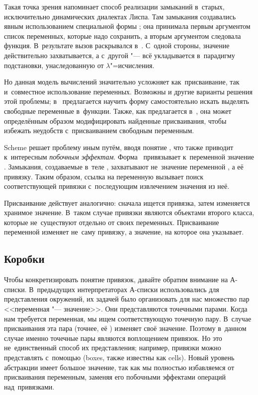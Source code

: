 Такая точка зрения напоминает способ реализации замыканий в~старых,
исключительно динамических диалектах Лиспа. Там замыкания создавались явным
использованием специальной формы ; она принимала первым аргументом
список переменных, которые надо сохранить, а вторым аргументом следовала
функция. В~результате вызов  раскрывался
в~. С~одной стороны,
значение действительно захватывается, а с~другой "--- всё укладывается
в~парадигму подстановки, унаследованную от $\lambda$"=исчисления.

Но данная модель вычислений значительно усложняет как~присваивание, так
и~совместное использование переменных. Возможны и другие варианты решения этой
проблемы; в~\cite{sj87} предлагается научить форму  самостоятельно
искать выделять свободные переменные в~функции. Также, как предлагается
в~\cite{bcsj86,sj93}, она может определённым образом модифицировать найденные
присваивания, чтобы избежать неудобств с~присваиванием свободным переменным.

Scheme решает проблему иным путём, вводя понятие , что также
приводит к~интересным \emph{побочным эффектам}. Форма~ привязывает
к~переменной  значение . Замыкания, создаваемые в~теле
, захватывают не~значение переменной , а её привязку. Таким
образом, ссылка на переменную  вызывает поиск соответствующей привязки
с~последующим извлечением значения из неё.

Присваивание действует аналогично: сначала ищется привязка, затем изменяется
хранимое значение. В~таком случае привязки являются объектами второго класса,
которые не~существуют отдельно от своих переменных. Присваивание переменной
изменяет не~саму привязку, а значение, на которое она указывает.


\subsection{Коробки}\label{assignment/assignment/ssect:boxes}

Чтобы конкретизировать понятие привязок, давайте обратим внимание на А-списки.
В~предыдущих интерпретаторах А-списки использовались для представления
окружений, их задачей было организовать для нас множество пар <<переменная "---
значение>>. Они представляются точечными парами. Когда нам требуется переменная,
мы ищем соответствующую точечную пару. В~случае присваивания эта пара (точнее,
её ) изменяет своё значение. Поэтому в~данном случае именно точечные
пары являются воплощением привязок. Но это не~единственный способ их
представления; например, привязки можно представлять с~помощью 
(boxes, также известны как cells). Новый уровень абстракции имеет большое
значение, так как мы полностью избавляемся от присваивания переменным, заменяя
его побочными эффектами операций над~привязками.

